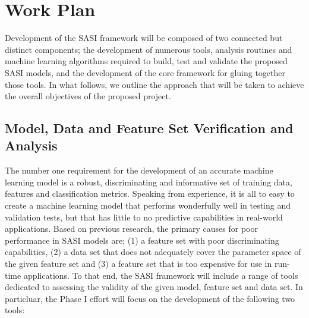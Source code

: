 \section{Work Plan} 
\label{sec:approach}


Development of the SASI framework will be composed of two connected but distinct components; the development of numerous tools, analysis routines and machine learning algorithms required to build, test and validate  the proposed SASI models, and the development of the core framework for gluing together those tools. In what follows, we outline the approach that will be taken to achieve the overall objectives of the proposed project. 

\subsection{ Model, Data and Feature Set Verification and Analysis }
\label{sec:modelvar}
The number one requirement for the development of an accurate machine learning model is a robust, discriminating and informative set of training data, features and classification metrics. Speaking from experience, it is all to easy to create a machine learning model that performs wonderfully well in testing and validation tests, but that has little to no predictive capabilities in real-world applications. Based on previous research, the primary causes for poor performance in SASI models are; (1) a feature set with poor discriminating capabilities, (2) a data set that does not adequately cover the parameter space of the given feature set and (3) a feature set that is too expensive for use in run-time applications. To that end, the SASI framework will include a range of tools dedicated to assessing the validity of the given model, feature set and data set. In particluar, the Phase I effort will focus on the development of the following two tools: 

